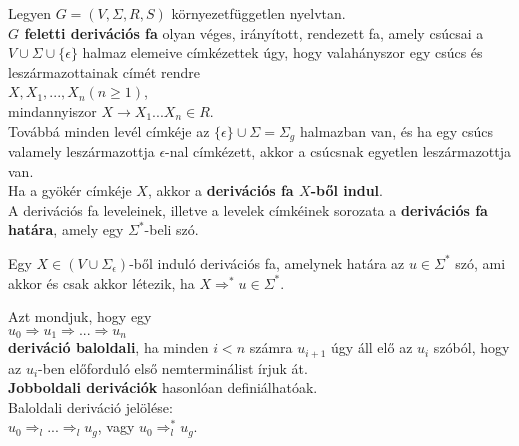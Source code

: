 \documentclass{beamer}
\newcommand{\mmedskip}{\vspace{0.5em}}
\newcommand{\mbigskip}{\vspace{1em}}
\begin{document}
\begin{frame}
\begin{tcolorbox}[title={Def.: Derivációs fa}]
Legyen $G = (V, {\Sigma}, R, S)$ környezetfüggetlen nyelvtan.\\
\textbf{$G$ feletti derivációs fa} olyan véges, irányított, rendezett fa, amely csúcsai a $V \cup {\Sigma} \cup \{{\epsilon}\}$ halmaz elemeive címkézettek úgy, hogy valahányszor egy csúcs és leszármazottainak címét rendre\\
\mmedskip
$X, X_1, ..., X_n (n \geq 1)$,\\
mindannyiszor $X \rightarrow X_1...X_n \in R$.\\
\mmedskip
Továbbá minden levél címkéje az $\{{\epsilon}\} \cup {\Sigma} = {\Sigma}_g$ halmazban van, és ha egy csúcs valamely leszármazottja $\epsilon$-nal címkézett, akkor a csúcsnak egyetlen leszármazottja van.\\
\mbigskip
Ha a gyökér címkéje $X$, akkor a \textbf{derivációs fa $X$-ből indul}.\\
\mbigskip
A derivációs fa leveleinek, illetve a levelek címkéinek sorozata a \textbf{derivációs fa határa}, amely egy ${\Sigma}^*$-beli szó.
\end{tcolorbox}
\end{frame}

\begin{frame}
\begin{tcolorbox}[title={Tétel: Derivációs fák}]
Egy $X \in (V \cup {\Sigma}_{\epsilon})$-ből induló derivációs fa, amelynek határa az $u \in {\Sigma}^*$ szó, ami akkor és csak akkor létezik, ha $X {\Rightarrow}^* u \in {\Sigma}^*$.
\end{tcolorbox}

\begin{tcolorbox}[title={Def.: Jobb-, Baloldali deriváció}]
Azt mondjuk, hogy egy\\
\mbigskip
$u_0 \Rightarrow u_1 \Rightarrow ... \Rightarrow u_n$\\
\mbigskip
\textbf{deriváció baloldali}, ha minden $i < n$ számra $u_{i + 1}$ úgy áll elő az $u_i$ szóból, hogy az $u_i$-ben előforduló első nemterminálist írjuk át.\\
\mbigskip
\textbf{Jobboldali derivációk} hasonlóan definiálhatóak.\\
\mbigskip
Baloldali deriváció jelölése:\\
\mbigskip
$u_0 {\Rightarrow}_l ... {\Rightarrow}_l u_g$, vagy $u_0 {\Rightarrow}^*_l u_g$.
\end{tcolorbox}
\end{frame}
\end{document}
